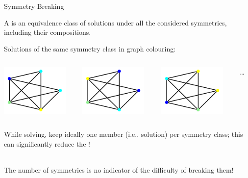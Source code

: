 \documentclass{cons-beamer}
\begin{document}
\begin{frame}{Symmetry Breaking}
  \begin{definition}
    A  is an equivalence class of solutions
    under all the considered symmetries, including their compositions.
  \end{definition}

  Solutions of the same symmetry class in graph colouring:
  \begin{columns}
    \begin{column}{0.25\textwidth}
      \includegraphics[height=25mm]{images/graph1.png}%
    \end{column}
    \begin{column}{0.25\textwidth}
      \includegraphics[height=25mm]{images/graph2.png}%
    \end{column}
    \begin{column}{0.25\textwidth}
      \includegraphics[height=25mm]{images/graph3.png}
    \end{column}
    \begin{column}{0.15\textwidth}
      \dots
    \end{column}
  \end{columns}
  \vfill
  
   While solving, keep ideally \alert{one} member (i.e., solution) per
  symmetry class; this can significantly reduce the !
  \vfill

   \\
  The number of symmetries is \alert{no} indicator of the difficulty of breaking them!
\end{frame}
\end{document}
